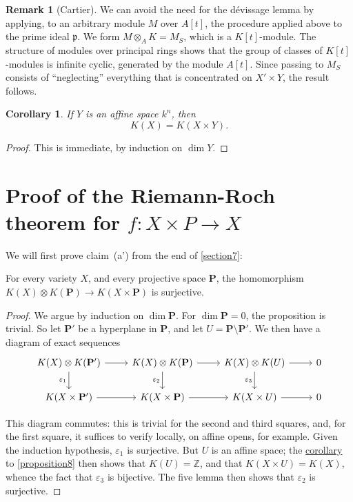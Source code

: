 \documentclass{article}
\theoremstyle{plain}
\newenvironment{proposition}[1]
    {\renewcommand\theinnercustomproposition{#1}\innercustomproposition}
    {\endinnercustomproposition}
\newtheorem*{corollary}{Corollary}
\theoremstyle{definition}
\newtheorem*{remark}{Remark}
\newcommand{\PP}{\mathbf{P}}
\newcommand{\oldpage}[1]{\marginpar{\footnotesize$\Big\vert$ \textit{p.~#1}}}
\begin{document}
\oldpage{118}
\begin{remark}[Cartier]
  We can avoid the need for the d\'{e}vissage lemma by applying, to an arbitrary module $M$ over $A[t]$, the procedure applied above to the prime ideal $\mathfrak{p}$.
  We form $M\otimes_A K=M_S$, which is a $K[t]$-module.
  The structure of modules over principal rings shows that the group of classes of $K[t]$-modules is infinite cyclic, generated by the module $A[t]$.
  Since passing to $M_S$ consists of ``neglecting'' everything that is concentrated on $X'\times Y$, the result follows.
\end{remark}

\begin{corollary}
\label{corollary-8}
  If $Y$ is an affine space $k^n$, then
  \[
    K(X) = K(X\times Y).
  \]
\end{corollary}

\begin{proof}
  This is immediate, by induction on $\dim Y$.
\end{proof}


\section{Proof of the Riemann-Roch theorem for $f\colon X\times P\to X$}
\label{section9}

We will first prove claim~(a') from the end of \cref{section7}:

\begin{proposition}{9}
\label{proposition9}
  For every variety $X$, and every projective space $\PP$, the homomorphism $K(X)\otimes K(\PP)\to K(X\times \PP)$ is surjective.
\end{proposition}

\begin{proof}
  We argue by induction on $\dim\PP$.
  For $\dim\PP=0$, the proposition is trivial.
  So let $\PP'$ be a hyperplane in $\PP$, and let $U=\PP\setminus\PP'$.
  We then have a diagram of exact sequences
  \[
    \begin{tikzcd}
      K(X)\otimes K(\PP') \rar \dar[swap,"\varepsilon_1"]
      & K(X)\otimes K(\PP) \rar \dar[swap,"\varepsilon_2"]
      & K(X)\otimes K(U) \rar \dar[swap,"\varepsilon_3"]
      & 0
    \\K(X\times\PP') \rar
      & K(X\times\PP) \rar
      & K(X\times U) \rar
      & 0
    \end{tikzcd}
  \]

  This diagram commutes:
  this is trivial for the second and third squares, and, for the first square, it suffices to verify locally, on affine opens, for example.
  Given the induction hypothesis, $\varepsilon_1$ is surjective.
  But $U$ is an affine space;
  the \hyperref[corollary-8]{corollary} to \cref{proposition8} then shows that $K(U)=\mathbb{Z}$, and that $K(X\times U)=K(X)$, whence the fact that $\varepsilon_3$ is bijective.
  The five lemma then shows that $\varepsilon_2$ is surjective.
\end{proof}
\end{document}
